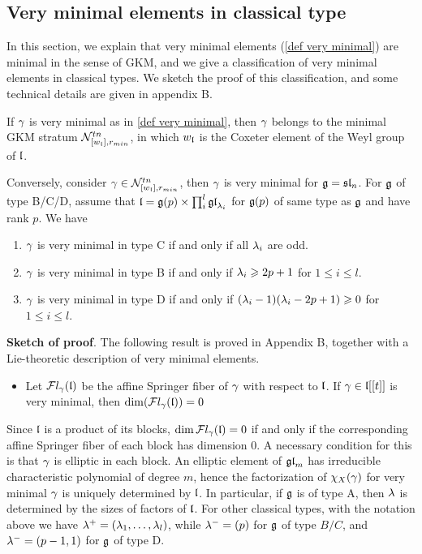 \documentclass[11pt]{article}
\numberwithin{equation}{section}
\begin{document}
\subsection{Very minimal elements in classical type}
In this section, we explain that very minimal elements (\cref{def very minimal}) are minimal in the sense of GKM, and we give a classification of very minimal elements in classical types. We sketch the proof of this classification, and some technical details are given in appendix B.
\begin{pro}\label{classify very minimal}
    If $\gamma$ is very minimal as in \cref{def very minimal}, then $\gamma$ belongs to the minimal GKM stratum $\mathcal{N}^{tn}_{[w_{\mathfrak{l}}],r_{min}}$, in which $w_{\mathfrak{l}}$ is the Coxeter element of the Weyl group of $\mathfrak{l}$. 
    
    Conversely, consider $\gamma \in \mathcal{N}^{tn}_{[w_{\mathfrak{l}}],r_{min}}$, then $\gamma$ is very minimal for $\mathfrak{g}= \mathfrak{sl}_n$. For $\mathfrak{g}$ of type B/C/D, assume that $\mathfrak{l}= \mathfrak{g}(p)\times \prod_{i}^{l}\mathfrak{gl}_{\lambda_i}$ for $\mathfrak{g}(p)$ of same type as $\mathfrak{g}$ and have rank $p$. We have
    \begin{enumerate}
        \item $\gamma$ is very minimal in type C if and only if all $\lambda_i$ are odd.
        \item $\gamma$ is very minimal in type B if and only if $\lambda_i\geqslant 2p+1$ for $1\leqslant i\leqslant l$.
        \item $\gamma$ is very minimal in type D if and only if $(\lambda_i-1)(\lambda_i-2p+1)\geqslant 0$ for $1\leqslant i\leqslant l$.
    \end{enumerate}
\end{pro}
\textbf{Sketch of proof}. The following result is proved in Appendix B, together with a Lie-theoretic description of very minimal elements.
\begin{itemize}
    \item Let $\mathcal{F}l_\gamma(\mathfrak{l})$ be the affine Springer fiber of $\gamma$ with respect to $\mathfrak{l}$. If $\gamma\in \mathfrak{l}[[t]]$ is very minimal, then $\dim(\mathcal{F}l_\gamma(\mathfrak{l}))=0$
\end{itemize}

Since $\mathfrak{l}$ is a product of its blocks, $\dim\mathcal{F}l_\gamma(\mathfrak{l})=0$ if and only if the corresponding
affine Springer fiber of each block has dimension $0$. A necessary condition for this is that $\gamma$ is elliptic in each block. An elliptic element of $\mathfrak{gl}_m$ has irreducible characteristic polynomial of degree $m$, hence the factorization of $\chi_X(\gamma)$ for very minimal $\gamma$ is uniquely determined by $\mathfrak{l}$. In particular, if $\mathfrak{g}$ is of type A, then $\lambda$ is determined by the sizes of factors of $\mathfrak{l}$. For other classical types, with the notation above we have $\lambda^+= (\lambda_1,\dots,\lambda_l)$, while $\lambda^-= (p)$ for $\mathfrak{g}$ of type $B/C$, and $\lambda^-= (p-1,1)$ for $\mathfrak{g}$ of type D. 
\end{document}
